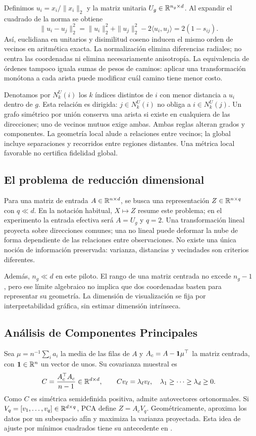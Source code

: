 Definimos $u_i=x_i/\|x_i\|_2$ y la matriz unitaria $U_g\in\mathbb{R}^{n_g\times d}$. Al expandir el cuadrado de la norma se obtiene
\begin{equation}\label{eq:unitarios}
 \|u_i-u_j\|_2^2=\|u_i\|_2^2+\|u_j\|_2^2-2\langle u_i,u_j\rangle
 =2(1-s_{ij}).
\end{equation}
Así, euclidiana en unitarios y disimilitud coseno inducen el mismo orden de vecinos en aritmética exacta. La normalización elimina diferencias radiales; no centra las coordenadas ni elimina necesariamente anisotropía. La equivalencia de órdenes tampoco iguala sumas de pesos de caminos: aplicar una transformación monótona a cada arista puede modificar cuál camino tiene menor costo.

Denotamos por $N_k^U(i)$ los $k$ índices distintos de $i$ con menor distancia a $u_i$ dentro de $g$. Esta relación es dirigida: $j\in N_k^U(i)$ no obliga a $i\in N_k^U(j)$. Un grafo simétrico por unión conserva una arista si existe en cualquiera de las direcciones; uno de vecinos mutuos exige ambas. Ambas reglas alteran grados y componentes. La geometría local alude a relaciones entre vecinos; la global incluye separaciones y recorridos entre regiones distantes. Una métrica local favorable no certifica fidelidad global.

\subsection{El problema de reducción dimensional}
Para una matriz de entrada $A\in\mathbb{R}^{n\times d}$, se busca una representación $Z\in\mathbb{R}^{n\times q}$ con $q\ll d$. En la notación habitual, $X\mapsto Z$ resume este problema; en el experimento la entrada efectiva será $A=U_g$ y $q=2$. Una transformación lineal proyecta sobre direcciones comunes; una no lineal puede deformar la nube de forma dependiente de las relaciones entre observaciones. No existe una única noción de información preservada: varianza, distancias y vecindades son criterios diferentes.

Además, $n_g\ll d$ en este piloto. El rango de una matriz centrada no excede $n_g-1$, pero ese límite algebraico no implica que dos coordenadas basten para representar su geometría. La dimensión de visualización se fija por interpretabilidad gráfica, sin estimar dimensión intrínseca.

\subsection{Análisis de Componentes Principales}
Sea $\mu=n^{-1}\sum_i a_i$ la media de las filas de $A$ y $A_c=A-\mathbf{1}\mu^\top$ la matriz centrada, con $\mathbf{1}\in\mathbb{R}^n$ un vector de unos. Su covarianza muestral es
\begin{equation}
 C=\frac{A_c^\top A_c}{n-1}\in\mathbb{R}^{d\times d},
 \qquad Cv_\ell=\lambda_\ell v_\ell,
 \quad \lambda_1\geq\cdots\geq\lambda_d\geq0.
\end{equation}
Como $C$ es simétrica semidefinida positiva, admite autovectores ortonormales. Si $V_q=[v_1,\ldots,v_q]\in\mathbb{R}^{d\times q}$, PCA define $Z=A_cV_q$. Geométricamente, aproxima los datos por un subespacio afín y maximiza la varianza proyectada. Esta idea de ajuste por mínimos cuadrados tiene su antecedente en \textcite{pearson1901}.

